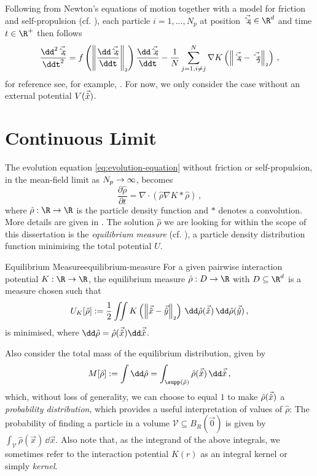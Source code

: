Following from Newton's equations of motion together with a model for friction and self-propulsion (cf. ), each particle $i=1, ..., N_p$ at position $\vec{\hat{x}_i} \in \R^d$ and time $t \in \R^+$ then follows
\begin{equation}
  \frac{\dd^2 \vec{\hat{x}_i}}{\ddt^2} = f\left(\norm{\frac{\dd \vec{\hat{x}_i}}{\ddt}}\right) \frac{\dd\vec{\hat{x}_i}}{\ddt} - \frac{1}{N} \sum_{j=1, i\neq j}^{N} \nabla K\left(\norm{\vec{\hat{x}_i} - \vec{\hat{x}_j}}\right)\,,
  \label{eq:evolution-equation}
\end{equation}
for reference see, for example, \cite{2020-power-law-kernels, 2021-arbitrary-dimensions, 2017-explicit-solutions}.
For now, we only consider the case without an external potential $V(\vec{\hat{x}})$.

\section{Continuous Limit}
The evolution equation \eqref{eq:evolution-equation} without friction or self-propulsion, in the mean-field limit as $N_p \rightarrow \infty$, becomes
\begin{equation}
  \frac{\partial \hat{\rho}}{\partial t} = \nabla \cdot \left(\hat{\rho} \nabla K * \hat{\rho}\right)\,,
  \label{eq:continuous-evolution-equation}
\end{equation}
where $\hat{\rho}: \R \to \R$ is the particle density function and $*$ denotes a convolution.
More details are given in \cite{2014-carrillo-derivation-of-mean-field, 2021-carrillo-radial}.
The solution $\hat{\rho}$ we are looking for within the scope of this dissertation is the \textit{equilibrium measure} (cf. ), a particle density distribution function minimising the total potential $U$.

\begin{definition}{Equilibrium Measure}{equilibrium-measure}
  For a given pairwise interaction potential $K: \R \to \R$, the equilibrium measure $\hat{\rho}: D \to \R$ with $D \subseteq \R^d$ is a measure chosen such that
  $$U_K[\hat{\rho}] := \frac{1}{2} \iint K\left(\norm{\hatvec{x} - \hatvec{y}}\right) \,\dd\hat{\rho}(\hatvec{x})\,\dd\hat{\rho}(\hatvec{y})\,,$$
  is minimised, where $\dd\hat{\rho} = \hat{\rho}(\hatvec{x})\dd\hatvec{x}$.
\end{definition}
Also consider the total mass of the equilibrium distribution, given by
\begin{equation}
  M[\hat{\rho}] := \int \dd\hat{\rho} = \int_{\supp(\hat{\rho})} \hat{\rho}(\hatvec{x}) \,\dd\hatvec{x}\,,
  \label{eq:measure-mass}
\end{equation}
which, without loss of generality, we can choose to equal $1$ to make $\hat{\rho}(\vec{\hat{x}})$ a \textit{probability distribution}, which provides a useful interpretation of values of $\hat{\rho}$:
The probability of finding a particle in a volume $\mathcal{V} \subseteq B_R(\vec{0})$ is given by $\int_{\mathcal{V}} \hat{\rho}(\vec{x}) \,\dd\vec{x}$.
Also note that, as the integrand of the above integrals, we sometimes refer to the interaction potential $K(r)$ as an integral kernel or simply \textit{kernel}.

